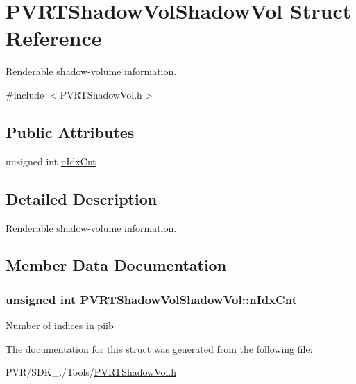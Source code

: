 \hypertarget{struct_p_v_r_t_shadow_vol_shadow_vol}{\section{P\+V\+R\+T\+Shadow\+Vol\+Shadow\+Vol Struct Reference}
\label{struct_p_v_r_t_shadow_vol_shadow_vol}
}


Renderable shadow-\/volume information.  




{\ttfamily \#include $<$P\+V\+R\+T\+Shadow\+Vol.\+h$>$}

\subsection*{Public Attributes}
\begin{DoxyCompactItemize}
\item 
unsigned int \hyperlink{struct_p_v_r_t_shadow_vol_shadow_vol_a0dd2027575459cc6f178cda43ccf1a22}{n\+Idx\+Cnt}
\end{DoxyCompactItemize}


\subsection{Detailed Description}
Renderable shadow-\/volume information. 



 

\subsection{Member Data Documentation}
\hypertarget{struct_p_v_r_t_shadow_vol_shadow_vol_a0dd2027575459cc6f178cda43ccf1a22}{
\subsubsection[{n\+Idx\+Cnt}]{\setlength{\rightskip}{0pt plus 5cm}unsigned int P\+V\+R\+T\+Shadow\+Vol\+Shadow\+Vol\+::n\+Idx\+Cnt}}\label{struct_p_v_r_t_shadow_vol_shadow_vol_a0dd2027575459cc6f178cda43ccf1a22}
Number of indices in piib 

The documentation for this struct was generated from the following file\+:\begin{DoxyCompactItemize}
\item 
P\+V\+R/\+S\+D\+K\+\_./\+Tools/\hyperlink{_p_v_r_t_shadow_vol_8h}{P\+V\+R\+T\+Shadow\+Vol.\+h}\end{DoxyCompactItemize}

